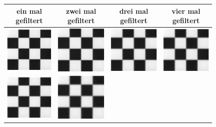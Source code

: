 \documentclass[12pt,german]{article}
\begin{document}
\begin{figure} [h!]
  \centering
  \begin{tabular}{| c | c | c | c |}
    \hline
    ein mal gefiltert & zwei mal gefiltert & drei mal gefiltert & vier mal gefiltert \\
    \hline
	\includegraphics[width=3cm]{../testData/Gauss/SchachbrettR4S4v1.jpg} & 	
	\includegraphics[width=3cm]{../testData/Gauss/SchachbrettR4S4v2.jpg} &
	\includegraphics[width=3cm]{../testData/Gauss/SchachbrettR4S4v3.jpg} & 	
	\includegraphics[width=3cm]{../testData/Gauss/SchachbrettR4S4v4.jpg} \\
	    \hline
	\includegraphics[width=3cm]{../testData/Gauss/SchachbrettR40S4v1.jpg} & 	
	\includegraphics[width=3cm]{../testData/Gauss/SchachbrettR40S4v2.jpg} &

\end{tabular}
\end{figure}
\end{document}
